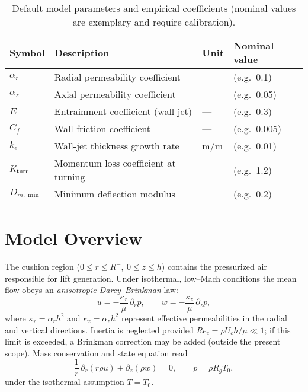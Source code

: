 \documentclass[11pt,a4paper]{article}
\begin{document}
\begin{table}[h]
  \centering
  \caption{Default model parameters and empirical coefficients (nominal values are exemplary and require calibration).}
  \label{tab:model-params}
  \begin{tabular}{@{}llll@{}}
    \toprule
    Symbol & Description & Unit & Nominal value \\
    \midrule
    $\alpha_r$     & Radial permeability coefficient      & —     & (e.g.\ 0.1) \\
    $\alpha_z$     & Axial permeability coefficient       & —     & (e.g.\ 0.05) \\
    $E$            & Entrainment coefficient (wall-jet)  & —     & (e.g.\ 0.3) \\
    $C_f$          & Wall friction coefficient           & —     & (e.g.\ 0.005) \\
    $k_e$          & Wall-jet thickness growth rate      & m/m   & (e.g.\ 0.01) \\
    $K_{\rm turn}$ & Momentum loss coefficient at turning& —     & (e.g.\ 1.2) \\
    $D_{m,\min}$   & Minimum deflection modulus         & —     & (e.g.\ 0.2) \\
    \bottomrule
  \end{tabular}
\end{table}


\section{Model Overview}
\label{sec:model-overview}

The cushion region ($0\le r\le R^{-},\ 0\le z\le h$) contains the pressurized air responsible for lift generation.
Under isothermal, low–Mach conditions the mean flow obeys an \emph{anisotropic Darcy–Brinkman} law:
\begin{equation}
  u = -\frac{\kappa_r}{\mu}\,\partial_r p , \qquad
  w = -\frac{\kappa_z}{\mu}\,\partial_z p ,
  \label{eq:darcy_brinkman}
\end{equation}
where $\kappa_r=\alpha_r h^2$ and $\kappa_z=\alpha_z h^2$ represent effective permeabilities in the radial and vertical directions.
Inertia is neglected provided $Re_c=\rho U_c h/\mu\ll 1$; if this limit is exceeded, a Brinkman correction may be added (outside the present scope).
Mass conservation and state equation read
\begin{equation}
  \frac{1}{r}\,\partial_r\!\left(r\rho u\right)+\partial_z(\rho w)=0,
  \qquad
  p=\rho R_g T_0,
\end{equation}
under the isothermal assumption $T=T_0$.
\end{document}
